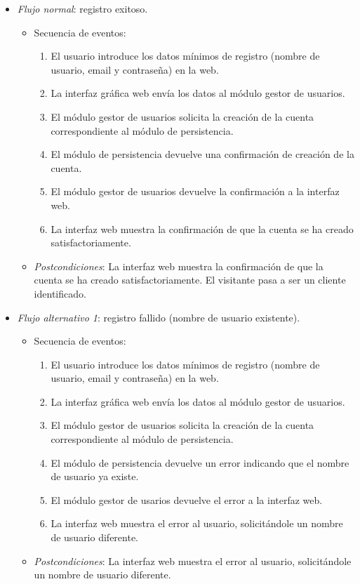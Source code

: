 \begin{enumerate}[{\bf UC-1}]
\begin{itemize}
  \item {\it Flujo normal}: registro exitoso.
    \begin{itemize}
\item Secuencia de eventos:
    \begin{enumerate}[1. ]
    \item El usuario introduce los datos mínimos de registro (nombre de usuario, email y contraseña) en la web.
    \item La interfaz gráfica web envía los datos al módulo gestor de usuarios.
    \item El módulo gestor de usuarios solicita la creación de la cuenta correspondiente al módulo de persistencia.
    \item El módulo de persistencia devuelve una confirmación de creación de la cuenta.
    \item El módulo gestor de usuarios devuelve la confirmación a la interfaz web.
    \item La interfaz web muestra la confirmación de que la cuenta se ha creado satisfactoriamente.
    \end{enumerate}
  \item {\it Postcondiciones}: La interfaz web muestra la confirmación de que la cuenta se ha creado satisfactoriamente. El visitante pasa a ser un cliente identificado.
    \end{itemize}

  \item {\it Flujo alternativo 1}: registro fallido (nombre de usuario existente).
\begin{itemize}
\item Secuencia de eventos:

    \begin{enumerate}[1. ]
    \item El usuario introduce los datos mínimos de registro (nombre de usuario, email y contraseña) en la web.
    \item La interfaz gráfica web envía los datos al módulo gestor de usuarios.
    \item El módulo gestor de usuarios solicita la creación de la cuenta correspondiente al módulo de persistencia.
    \item El módulo de persistencia devuelve un error indicando que el nombre de usuario ya existe.
    \item El módulo gestor de usarios devuelve el error a la interfaz web.
    \item La interfaz web muestra el error al usuario, solicitándole un nombre de usuario diferente.
    \end{enumerate}
  \item {\it Postcondiciones}: La interfaz web muestra el error al usuario, solicitándole un nombre de usuario diferente. \end{itemize}


\end{itemize}
\end{enumerate}
